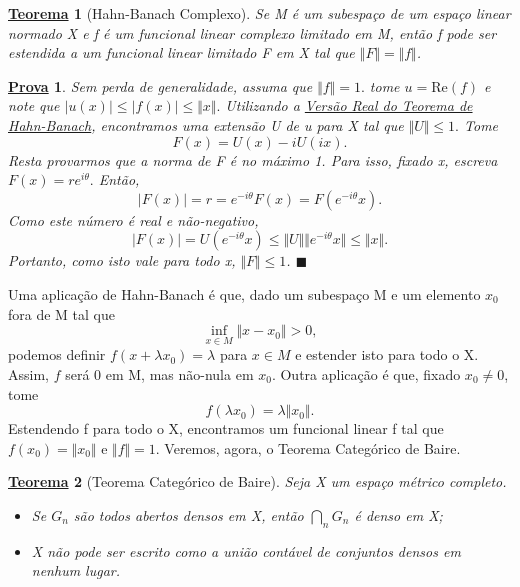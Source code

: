 \documentclass{article}
\newtheorem*{theorem*}{\underline{Teorema}}
\newtheorem*{proof*}{\underline{Prova}}
\renewcommand\qedsymbol{$\blacksquare$}
\begin{document}
 \hypertarget{complex_hahn_banach}{
   \begin{theorem*}[Hahn-Banach Complexo]
    Se M é um subespaço de um espaço linear normado X e f é um funcional linear complexo limitado em M, então f pode ser estendida a um funcional linear limitado F em X tal que \(\Vert F \Vert = \Vert f \Vert\).
  \end{theorem*}
 }
 \begin{proof*}
   Sem perda de generalidade, assuma que \(\Vert f \Vert = 1.\) tome \(u= \mathrm{Re}(f)\) e note que \(|u(x)|\leq |f(x)|\leq \Vert x \Vert.\) Utilizando a \hyperlink{real_hahn_banach}{\textit{Versão Real do Teorema de Hahn-Banach}}, encontramos uma extensão U de u para X tal que \(\Vert U \Vert \leq 1.\) Tome 
     \[
       F(x) = U(x) - iU(ix).
     \]
    Resta provarmos que a norma de F é no máximo 1. Para isso, fixado x, escreva \(F(x) = re^{i\theta }.\) Então, 
      \[
        |F(x)| = r = e^{-i\theta }F(x) = F(e^{-i\theta }x).
      \]
    Como este número é real e não-negativo,
      \[
        |F(x)| = U(e^{-i\theta }x)\leq \Vert U \Vert\Vert e^{-i\theta }x \Vert\leq \Vert x \Vert.
      \]
    Portanto, como isto vale para todo x, \(\Vert F \Vert \leq 1\). \qedsymbol
 \end{proof*}
  Uma aplicação de Hahn-Banach é que, dado um subespaço M e um elemento \(x_{0}\) fora de M tal que 
    \[
      \inf_{x\in M}\Vert x-x_{0} \Vert > 0,
    \]
  podemos definir \(f(x+\lambda x_{0}) = \lambda \) para \(x\in M\) e estender isto para todo o X. Assim, \(f\) será 0 em M, mas não-nula em \(x_{0}\). Outra aplicação é que, fixado \(x_{0}\neq 0\), tome 
    \[
      f(\lambda x_{0}) = \lambda \Vert x_{0} \Vert.
    \]
  Estendendo f para todo o X, encontramos um funcional linear f tal que \(f(x_{0}) = \Vert x_{0} \Vert \) e \(\Vert f \Vert = 1\).
    Veremos, agora, o Teorema Categórico de Baire. 
  \hypertarget{baire_category}{
    \begin{theorem*}[Teorema Categórico de Baire]
     Seja X um espaço métrico completo. 
    \begin{itemize}
      \item[1)] Se \(G_{n}\) são todos abertos densos em X, então \(\bigcap_{n}^{}G_{n}\) é denso em X;
        \item[2)] X não pode ser escrito como a união contável de conjuntos densos em nenhum lugar.
    \end{itemize}
   \end{theorem*}
  }
\end{document}
